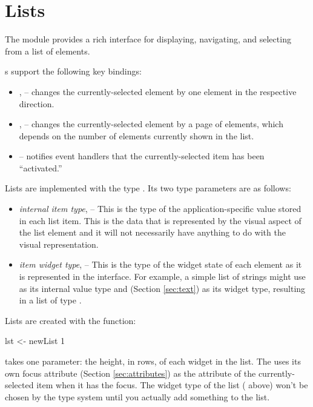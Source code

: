 \section{Lists}
\label{sec:lists}

The  module provides a rich interface for displaying,
navigating, and selecting from a list of elements.

s support the following key bindings:

\begin{itemize}
\item {},  -- changes the currently-selected element by
  one element in the respective direction.
\item {},  -- changes the currently-selected
  element by a page of elements, which depends on the number of
  elements currently shown in the list.
\item {} -- notifies event handlers that the
  currently-selected item has been ``activated.''
\end{itemize}

Lists are implemented with the type .  Its two type
parameters are as follows:

\begin{itemize}
\item \textit{internal item type},  -- This is the type of the
  application-specific value stored in each list item.  This is the
  data that is represented by the visual aspect of the list element
  and it will not necessarily have anything to do with the visual
  representation.
\item \textit{item widget type},  -- This is the type of the
  widget state of each element as it is represented in the interface.
  For example, a simple list of strings might use  as its
  internal value type and  (Section
  \ref{sec:text}) as its widget type, resulting in a list of type
  .
\end{itemize}

Lists are created with the  function:

\begin{haskellcode}
 lst <- newList 1
\end{haskellcode}

 takes one parameter: the height, in rows, of each widget in the
list.  The  uses its own focus attribute (Section
\ref{sec:attributes}) as the attribute of the currently-selected item when it
has the focus.  The widget type of the list ( above) won't be chosen by
the type system until you actually add something to the list.

